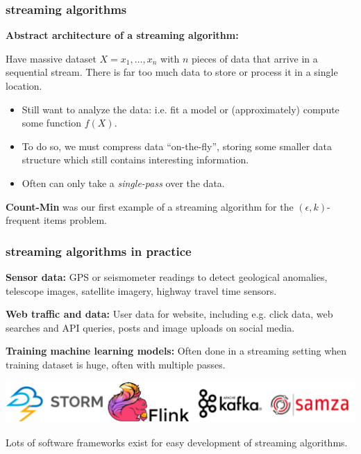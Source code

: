 \documentclass[handout,compress]{beamer}
\begin{document}
\begin{frame}
	\frametitle{streaming algorithms}
	\textbf{Abstract architecture of a streaming algorithm:} 
	
	Have massive dataset $X = {x_1, \ldots, x_n}$ with $n$ pieces of data that arrive in a sequential stream. There is far too much data to store or process it in a single location.
	\begin{itemize}
		\item Still want to analyze the data: i.e. fit a model or (approximately) compute some function $f(X)$.
		\item To do so, we must compress data ``on-the-fly'', storing some smaller data structure which still contains interesting information.
		\item Often can only take a \emph{single-pass} over the data. 
	\end{itemize}
\begin{center}
	\textbf{Count-Min} was our first example of a streaming algorithm for the $(\epsilon,k)$-frequent items problem. 
\end{center}
\end{frame}

\begin{frame}
	\frametitle{streaming algorithms in practice}
	\textbf{Sensor data:} GPS or seismometer readings to detect geological anomalies, telescope images, satellite imagery, highway travel time sensors.
	
	\textbf{Web traffic and data:} User data for website, including e.g. click data, web searches and API queries, posts and image uploads on social media.
	
	\textbf{Training machine learning models:} Often done in a streaming setting when training dataset is huge, often with multiple passes.
	\begin{center}
		\includegraphics[width=.8\textwidth]{streamFrameworks.png}
		
		Lots of software frameworks exist for easy development of streaming algorithms.
	\end{center}
\end{frame}
\end{document}

